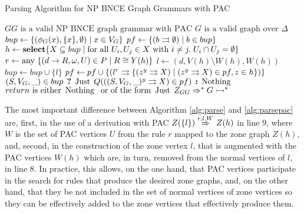 \begin{algorithm}[!h]
	\caption{Parsing Algorithm for NP BNCE Graph Grammars with PAC}
	\begin{algorithmic}[1]
		\Require $GG \text{ is a valid NP BNCE graph grammar with PAC}$
		\Require $G \text{ is a valid graph over } \Delta$
		\State $bup \gets \{(\phi_G(x),\{x\},\emptyset) \; | \; x \in V_G\}$
		\State $pf \gets \{ \ptree{b}{}{\emptyset} \st b \in bup \}$
		\Repeat
		\State $h \gets \text{\textbf{select}} \{X \subseteq bup \; | \;\text{for all } U_i, U_j \in X \text{ with } i \neq j . \; U_i \cap U_j = \emptyset \}$
		\State $r \gets \text{any } \{(d \to R,\omega,U) \in P \; | \; R \cong Y(h) \}$
		\State $l \gets (d,V(h)\setminus W(h), W(h))$ 
		 
		\State $bup \gets bup \cup \{l\}$
		\State $pf \gets pf \cup \{ \ptree{l}{r}{\{\ptree{z}{y}{X} \st \ptree{z}{y}{X} \in pf, z \in h \}} \}$
		\EndIf
		\EndFor
		 
		\State \Return $(S, V_G, \_) \in bup \? \Just Q(\ptree{(S,V_G, \_)}{y}{X} \in pf) \: \Nothing $
		\EndFunction
		\Ensure $return \text{ is either } \operatorname{\text{Nothing}}\; \text{ or of the form } \operatorname{\text{Just}}\; Z_{GG} \Rightarrow^*_{} G \rightarrowtail^*$
	\end{algorithmic}
	\label{alg:parsepac}
\end{algorithm}

The most important difference between Algorithm \ref{alg:parse} and \ref{alg:parsepac} are, first, in the use of a derivation with PAC $Z(\{l\}) \overset{r,l,W}{\Rightarrow}_{} Z(h)$ in line 9, where $W$ is the set of PAC vertices $U$ from the rule $r$ mapped to the zone graph $Z(h)$, and, second, in the construction of the zone vertex $l$, that is augmented with the PAC vertices $W(h)$ which are, in turn, removed from the normal vertices of $l$, in line 8. In practice, this allows, on the one hand, that PAC vertices participate in the search for rules that produce the desired zone graphs, and, on the other hand, that they be not included in the set of normal vertices of zone vertices so they can be effectively added to the zone vertices that effectively produce them.

